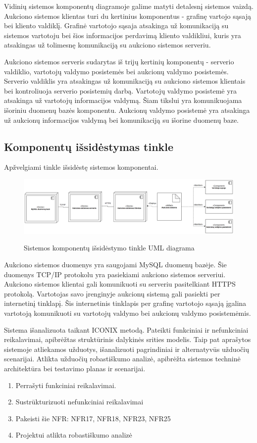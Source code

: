 \documentclass{VUMIFPSkursinis}
\begin{document}
	Vidinių sistemos komponentų diagramoje galime matyti detalesnį sistemos vaizdą. Aukciono sistemos klientas turi du kertinius komponentus - grafinę vartojo sąsają bei kliento valdiklį. Grafinė vartotojo sąsaja atsakinga už komunikaciją su sistemos vartotoju bei šios informacijos perdavimą kliento valdikliui, kuris yra atsakingas už tolimesnę komunikaciją su aukciono sistemos serveriu.

	Aukciono sistemos serveris sudarytas iš trijų kertinių komponentų - serverio valdiklio, vartotojų valdymo posistemės bei aukcionų valdymo posistemės. Serverio valdiklis yra atsakingas už komunikaciją su aukciono sistemos klientais bei kontroliuoja serverio posistemių darbą. Vartotojų valdymo posistemė yra atsakinga už vartotojų informacijos valdymą. Šiam tikslui yra komunikuojama išoriniu duomenų bazės komponentu. Aukcionų valdymo posistemė yra atsakinga už aukcionų informacijos valdymą bei komunikaciją su išorine duomenų baze.

	\newpage

	\subsection{Komponentų išsidėstymas tinkle}
	Apžvelgiami tinkle išsidėstę sistemos komponentai.
	\begin{figure}[H]
		\centering
		\includegraphics[width=\linewidth]{img/umlNetworkComponentDiagram.png}
		\label{fig:aukckoreg}
		\caption{Sistemos komponentų išsidėstymo tinkle UML diagrama}
	\end{figure}

	Aukciono sistemos duomenys yra saugojami MySQL duomenų bazėje. Šie duomenys TCP/IP protokolu yra pasiekiami aukciono sistemos serveriui. Aukciono sistemos klientai gali komunikuoti su serveriu pasitelkiant HTTPS protokolą. Vartotojas savo įrenginyje aukcionų sistemą gali pasiekti per internetinį tinklapį. Šis internetinis tinklapis per grafinę vartotojo sąsają įgalina vartotoją komunikuoti su vartotojų valdymo bei aukcionų valdymo posistemėmis.

	\newpage

	Sistema išanalizuota taikant ICONIX metodą. Pateikti funkciniai ir nefunkciniai reikalavimai, apibrėžtas struktūrinis dalykinės srities modelis. Taip pat aprašytos sistemoje atliekamos užduotys, išanalizuoti pagrindiniai ir alternatyvūs užduočių scenarijai. Atlikta užduočių robastiškumo analizė, apibrėžta sistemos techninė architektūra bei testavimo planas ir scenarijai.
	\newpage

		\begin{enumerate}
		\item Perrašyti funkciniai reikalavimai.
		\item Sustrūkturizuoti nefunkciniai reikalavimai
		\item  Pakeisti šie NFR: NFR17, NFR18, NFR23, NFR25
		\item Projektui atlikta robastiškumo analizė
	\end{enumerate}
\end{document}
